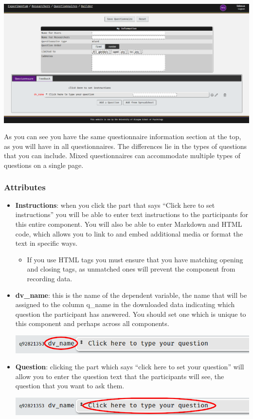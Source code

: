 \documentclass[]{book}
\providecommand{\tightlist}{%
  \setlength{\itemsep}{0pt}\setlength{\parskip}{0pt}}
\begin{document}
\includegraphics{images/screenshots/quest_mixed.png}

As you can see you have the same questionnaire information section at
the top, as you will have in all questionnaires. The differences lie in
the types of questions that you can include. Mixed questionnaires can
accommodate multiple types of questions on a single page.

\subsubsection*{Attributes}\label{attributes}

\begin{itemize}
\tightlist
\item
  \textbf{Instructions}: when you click the part that says ``Click here
  to set instructions'' you will be able to enter text instructions to
  the participants for this entire component. You will also be able to
  enter Markdown and HTML code, which allows you to link to and embed
  additional media or format the text in specific ways.

  \begin{itemize}
  \tightlist
  \item
    If you use HTML tags you must ensure that you have matching opening
    and closing tags, as unmatched ones will prevent the component from
    recording data.
  \end{itemize}
\item
  \textbf{dv\_name}: this is the name of the dependent variable, the
  name that will be assigned to the column q\_name in the downloaded
  data indicating which question the participant has answered. You
  should set one which is unique to this component and perhaps across
  all components.

  \includegraphics{images/screenshots/qname.png}
\item
  \textbf{Question}: clicking the part which says ``click here to set
  your question'' will allow you to enter the question text that the
  participants will see, the question that you want to ask them.

  \includegraphics{images/screenshots/qtext.png}
\end{itemize}
\end{document}
